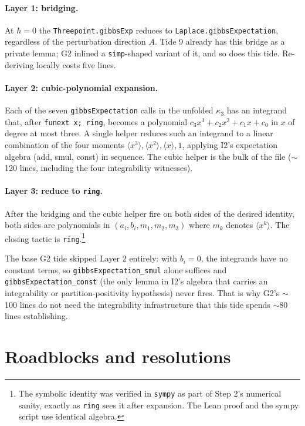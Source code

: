 \documentclass[11pt]{article}
\begin{document}
\paragraph{Layer 1: bridging.} At $h = 0$ the
\texttt{Threepoint.gibbsExp} reduces to
\texttt{Laplace.gibbsExpectation}, regardless of the perturbation
direction $A$. Tide 9 already has this bridge as a private lemma;
G2 inlined a \texttt{simp}-shaped variant of it, and so does this
tide. Re-deriving locally costs five lines.

\paragraph{Layer 2: cubic-polynomial expansion.} Each of the seven
\texttt{gibbsExpectation} calls in the unfolded $\kappa_3$ has an
integrand that, after \texttt{funext x; ring}, becomes a polynomial
$c_3 x^3 + c_2 x^2 + c_1 x + c_0$ in $x$ of degree at most three. A
single helper reduces such an integrand to a linear combination of
the four moments
$\langle x^3 \rangle, \langle x^2 \rangle, \langle x \rangle, 1$,
applying I2's expectation algebra (add, smul, const) in sequence.
The cubic helper is the bulk of the file ($\sim$120 lines, including
the four integrability witnesses).

\paragraph{Layer 3: reduce to \texttt{ring}.} After the bridging and
the cubic helper fire on both sides of the desired identity, both
sides are polynomials in $(a_i, b_i, m_1, m_2, m_3)$ where $m_k$
denotes $\langle x^k \rangle$. The closing tactic is
\texttt{ring}.\footnote{The symbolic identity was verified in
\texttt{sympy} as part of Step 2's numerical sanity, exactly as
\texttt{ring} sees it after expansion. The Lean proof and the sympy
script use identical algebra.}

The base G2 tide skipped Layer 2 entirely: with $b_i = 0$, the
integrands have no constant terms, so
\texttt{gibbsExpectation\_smul} alone suffices and
\texttt{gibbsExpectation\_const} (the only lemma in I2's algebra
that carries an integrability or partition-positivity hypothesis)
never fires. That is why G2's $\sim$100 lines do not need the
integrability infrastructure that this tide spends $\sim$80 lines
establishing.

\section{Roadblocks and resolutions}
\end{document}
